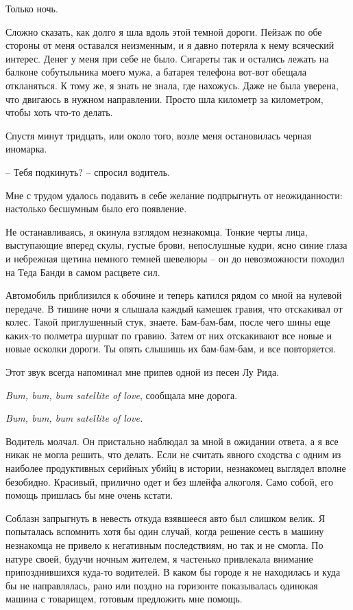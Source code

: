\documentclass[
]{book}
\begin{document}
Только ночь.

Сложно сказать, как долго я шла вдоль этой темной дороги. Пейзаж по обе стороны от меня оставался неизменным, и я давно потеряла к нему всяческий интерес. Денег у меня при себе не было. Сигареты так и остались лежать на балконе собутыльника моего мужа, а батарея телефона вот-вот обещала откланяться. К тому же, я знать не знала, где нахожусь. Даже не была уверена, что двигаюсь в нужном направлении. Просто шла километр за километром, чтобы хоть что-то делать.

Спустя минут тридцать, или около того, возле меня остановилась черная иномарка.

-- Тебя подкинуть? -- спросил водитель.

Мне с трудом удалось подавить в себе желание подпрыгнуть от неожиданности: настолько бесшумным было его появление.

Не останавливаясь, я окинула взглядом незнакомца. Тонкие черты лица, выступающие вперед скулы, густые брови, непослушные кудри, ясно синие глаза и небрежная щетина немного темней шевелюры -- он до невозможности походил на Теда Банди в самом расцвете сил.

Автомобиль приблизился к обочине и теперь катился рядом со мной на нулевой передаче. В тишине ночи я слышала каждый камешек гравия, что отскакивал от колес. Такой приглушенный стук, знаете. Бам-бам-бам, после чего шины еще каких-то полметра шуршат по гравию. Затем от них отскакивают все новые и новые осколки дороги. Ты опять слышишь их бам-бам-бам, и все повторяется.

Этот звук всегда напоминал мне припев одной из песен Лу Рида.

\emph{Bum, bum, bum satellite of love}, сообщала мне дорога.

\emph{Bum, bum, bum satellite of love.}

Водитель молчал. Он пристально наблюдал за мной в ожидании ответа, а я все никак не могла решить, что делать. Если не считать явного сходства с одним из наиболее продуктивных серийных убийц в истории, незнакомец выглядел вполне безобидно. Красивый, прилично одет и без шлейфа алкоголя. Само собой, его помощь пришлась бы мне очень кстати.

Соблазн запрыгнуть в невесть откуда взявшееся авто был слишком велик. Я попыталась вспомнить хотя бы один случай, когда решение сесть в машину незнакомца не привело к негативным последствиям, но так и не смогла. По натуре своей, будучи ночным жителем, я частенько привлекала внимание припозднившихся куда-то водителей. В каком бы городе я не находилась и куда бы не направлялась, рано или поздно на горизонте показывалась одинокая машина с товарищем, готовым предложить мне помощь.
\end{document}
